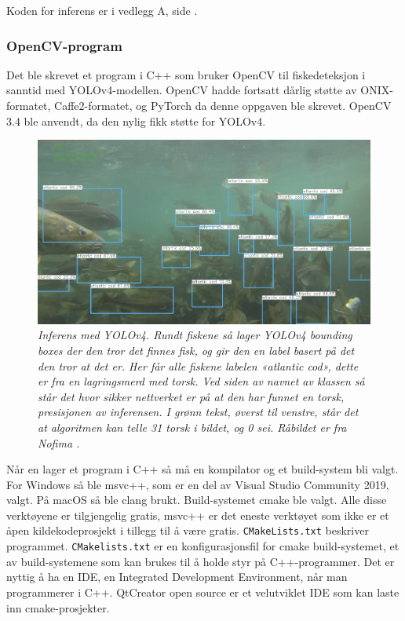 Koden for inferens er i vedlegg A, side \pageref{lst:inferens_retinanet}.

\subsubsection{OpenCV-program} \label{part:opencv}

Det ble skrevet et program i C++ som bruker OpenCV til fiskedeteksjon i sanntid med YOLOv4-modellen. OpenCV hadde fortsatt dårlig støtte av ONIX-formatet, Caffe2-formatet, og PyTorch da denne oppgaven ble skrevet. OpenCV 3.4 ble anvendt, da den nylig fikk støtte for YOLOv4. \cite{Batanina 2020}

\begin{figure}
\begin{center} 
\includegraphics[scale=0.35]{figures/inference_yolo}
\caption{\small \sl Inferens med YOLOv4. Rundt fiskene så lager YOLOv4 bounding boxes der den tror det finnes fisk, og gir den en label basert på det den tror at det er. Her får alle fiskene labelen «atlantic cod», dette er fra en lagringsmerd med torsk. Ved siden av navnet av klassen så står det hvor sikker nettverket er på at den har funnet en torsk, presisjonen av inferensen. I grønn tekst, øverst til venstre, står det at algoritmen kan telle 31 torsk i bildet, og 0 sei. Råbildet er fra Nofima \cite{Lindberg og Evensen 2020}. \label{fig:yolo_inference}} 
\end{center} 
\end{figure} 

Når en lager et program i C++ så må en kompilator og et build-system bli valgt. For Windows så ble msvc++, som er en del av Visual Studio Community 2019, valgt. På macOS så ble clang brukt. Build-systemet cmake ble valgt. Alle disse verktøyene er tilgjengelig gratis, msvc++ er det eneste verktøyet som ikke er et åpen kildekodeprosjekt i tillegg til å være gratis. \texttt{CMakeLists.txt} beskriver programmet. \texttt{CMakelists.txt} er en konfigurasjonsfil for cmake build-systemet, et av build-systemene som kan brukes til å holde styr på C++-programmer. Det er nyttig å ha en IDE, en Integrated Development Environment, når man programmerer i C++. QtCreator open source er et velutviklet IDE som kan laste inn cmake-prosjekter.

